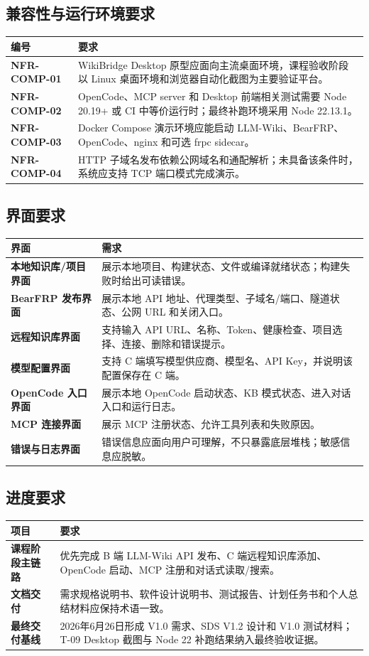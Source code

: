 \documentclass[UTF8,a4paper,12pt,fontset=fandol]{ctexart}
\begin{document}
\subsection{兼容性与运行环境要求}
\begin{longtable}{>{\bfseries}p{3.0cm}p{11.2cm}}
\toprule
编号 & 要求 \\
\midrule
NFR-COMP-01 & WikiBridge Desktop 原型应面向主流桌面环境，课程验收阶段以 Linux 桌面环境和浏览器自动化截图为主要验证平台。 \\
NFR-COMP-02 & OpenCode、MCP server 和 Desktop 前端相关测试需要 Node 20.19+ 或 CI 中等价运行时；最终补跑环境采用 Node 22.13.1。 \\
NFR-COMP-03 & Docker Compose 演示环境应能启动 LLM-Wiki、BearFRP、OpenCode、nginx 和可选 frpc sidecar。 \\
NFR-COMP-04 & HTTP 子域名发布依赖公网域名和通配解析；未具备该条件时，系统应支持 TCP 端口模式完成演示。 \\
\bottomrule
\end{longtable}

\subsection{界面要求}
\begin{longtable}{>{\bfseries}p{3.2cm}p{11.0cm}}
\toprule
界面 & 需求 \\
\midrule
本地知识库/项目界面 & 展示本地项目、构建状态、文件或编译就绪状态；构建失败时给出可读错误。 \\
BearFRP 发布界面 & 展示本地 API 地址、代理类型、子域名/端口、隧道状态、公网 URL 和关闭入口。 \\
远程知识库界面 & 支持输入 API URL、名称、Token、健康检查、项目选择、连接、删除和错误提示。 \\
模型配置界面 & 支持 C 端填写模型供应商、模型名、API Key，并说明该配置保存在 C 端。 \\
OpenCode 入口界面 & 展示本地 OpenCode 启动状态、KB 模式状态、进入对话入口和运行日志。 \\
MCP 连接界面 & 展示 MCP 注册状态、允许工具列表和失败原因。 \\
错误与日志界面 & 错误信息应面向用户可理解，不只暴露底层堆栈；敏感信息应脱敏。 \\
\bottomrule
\end{longtable}

\subsection{进度要求}
\begin{longtable}{>{\bfseries}p{3.2cm}p{11.0cm}}
\toprule
项目 & 要求 \\
\midrule
课程阶段主链路 & 优先完成 B 端 LLM-Wiki API 发布、C 端远程知识库添加、OpenCode 启动、MCP 注册和对话式读取/搜索。 \\
文档交付 & 需求规格说明书、软件设计说明书、测试报告、计划任务书和个人总结材料应保持术语一致。 \\
最终交付基线 & 2026年6月26日形成 V1.0 需求、SDS V1.2 设计和 V1.0 测试材料；T-09 Desktop 截图与 Node 22 补跑结果纳入最终验收证据。 \\
\bottomrule
\end{longtable}
\end{document}
